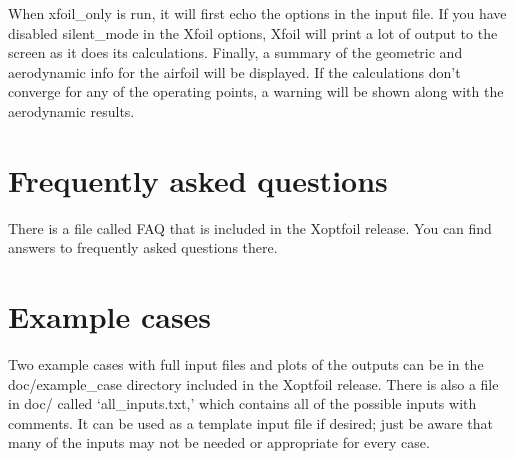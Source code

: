\documentclass[11pt]{article}
\begin{document}
When xfoil\_only is run, it will first echo the options in the input file. If you have
disabled silent\_mode in the Xfoil options, Xfoil will print a lot of output to the screen
as it does its calculations. Finally, a summary of the geometric and aerodynamic info for
the airfoil will be displayed. If the calculations don't converge for any of the operating
points, a warning will be shown along with the aerodynamic results.

\section{Frequently asked questions}

There is a file called FAQ that is included in the Xoptfoil release. You can find answers
to frequently asked questions there.

\section{Example cases}

Two example cases with full input files and plots of the outputs can be in the
doc/example\_case directory included in the Xoptfoil release. There is also a file in
doc/ called `all\_inputs.txt,' which contains all of the possible inputs with comments.
It can be used as a template input file if desired; just be aware that many of the inputs
may not be needed or appropriate for every case.
\end{document}
